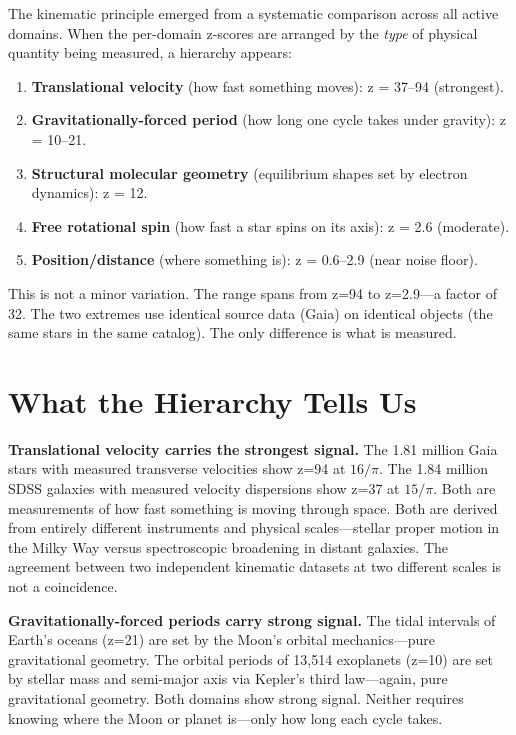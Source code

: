 \documentclass[11pt, letterpaper, openany]{book}
\begin{document}
The kinematic principle emerged from a systematic comparison across all active domains. When
the per-domain z-scores are arranged by the \emph{type} of physical quantity being measured,
a hierarchy appears:

\begin{enumerate}
    \item \textbf{Translational velocity} (how fast something moves): z = 37--94 (strongest).
    \item \textbf{Gravitationally-forced period} (how long one cycle takes under gravity): z = 10--21.
    \item \textbf{Structural molecular geometry} (equilibrium shapes set by electron dynamics): z = 12.
    \item \textbf{Free rotational spin} (how fast a star spins on its axis): z = 2.6 (moderate).
    \item \textbf{Position/distance} (where something is): z = 0.6--2.9 (near noise floor).
\end{enumerate}

This is not a minor variation. The range spans from z=94 to z=2.9---a factor of 32. The two
extremes use identical source data (Gaia) on identical objects (the same stars in the same
catalog). The only difference is what is measured.

\section*{What the Hierarchy Tells Us}

\textbf{Translational velocity carries the strongest signal.} The 1.81 million Gaia stars
with measured transverse velocities show z=94 at $16/\pi$. The 1.84 million SDSS galaxies
with measured velocity dispersions show z=37 at $15/\pi$. Both are measurements of how fast
something is moving through space. Both are derived from entirely different instruments and
physical scales---stellar proper motion in the Milky Way versus spectroscopic broadening in
distant galaxies. The agreement between two independent kinematic datasets at two different
scales is not a coincidence.

\textbf{Gravitationally-forced periods carry strong signal.} The tidal intervals of Earth's
oceans (z=21) are set by the Moon's orbital mechanics---pure gravitational geometry. The
orbital periods of 13,514 exoplanets (z=10) are set by stellar mass and semi-major axis via
Kepler's third law---again, pure gravitational geometry. Both domains show strong signal.
Neither requires knowing where the Moon or planet is---only how long each cycle takes.
\end{document}
